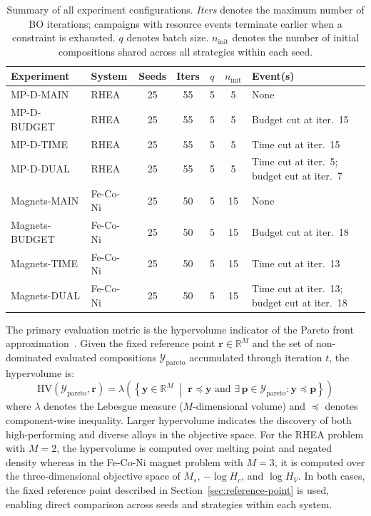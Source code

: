 \begin{table}[h]
\centering
\begin{tabular}{llccccp{4.5cm}}
\toprule
Experiment         & System                     & Seeds & Iters & $q$ & $n_\mathrm{init}$ & Event(s) \\
\midrule
MP-D-MAIN     & RHEA & 25   & 55    & 5   & 5 & None \\
MP-D-BUDGET   & RHEA & 25   & 55    & 5   & 5 & Budget cut at iter.\ 15 \\
MP-D-TIME     & RHEA & 25   & 55    & 5   & 5 & Time cut at iter.\ 15 \\
MP-D-DUAL     & RHEA & 25   & 55    & 5   & 5 & Time cut at iter.\ 5; budget cut at iter.\ 7 \\
Magnets-MAIN   & Fe-Co-Ni & 25  & 50    & 5   & 15 & None \\
Magnets-BUDGET & Fe-Co-Ni & 25  & 50    & 5   & 15 & Budget cut at iter.\ 18 \\
Magnets-TIME   & Fe-Co-Ni & 25  & 50    & 5   & 15 & Time cut at iter.\ 13 \\
Magnets-DUAL   & Fe-Co-Ni & 25  & 50    & 5   & 15 & Time cut at iter.\ 13; budget cut at iter.\ 18 \\
\bottomrule
\end{tabular}
\caption{Summary of all experiment configurations. \textit{Iters} denotes the maximum number of BO iterations; campaigns with resource events terminate earlier when a constraint is exhausted. $q$ denotes batch size. $n_\mathrm{init}$ denotes the number of initial compositions shared across all strategies within each seed.
}
\label{tab:experiments}
\end{table}

The primary evaluation metric is the hypervolume indicator of the Pareto front approximation~\citep{Zitzler1998}. Given the fixed reference point $\mathbf{r} \in \mathbb{R}^M$ and the set of non-dominated evaluated compositions $\mathcal{Y}_\mathrm{pareto}$ accumulated through iteration $t$, the hypervolume is:
%
\begin{equation}
\label{eq:hypervolume}
\mathrm{HV}(\mathcal{Y}_\mathrm{pareto}, \mathbf{r})
    = \lambda\!\left(
        \left\{
            \mathbf{y} \in \mathbb{R}^M \;\middle|\;
            \mathbf{r} \preceq \mathbf{y}
            \text{ and }
            \exists\, \mathbf{p} \in \mathcal{Y}_\mathrm{pareto} : \mathbf{y} \preceq \mathbf{p}
        \right\}
    \right)
\end{equation}
%
where $\lambda$ denotes the Lebesgue measure ($M$-dimensional volume) and $\preceq$ denotes component-wise inequality. Larger hypervolume indicates the discovery of both high-performing and diverse alloys in the objective space. For the RHEA problem with $M=2$, the hypervolume is computed over melting point and negated density whereas in the Fe-Co-Ni magnet problem with $M=3$, it is computed over the three-dimensional objective space of $M_s$, $-\log H_c$, and $\log H_V$. In both cases, the fixed reference point described in Section~\ref{sec:reference-point} is used, enabling direct comparison across seeds and strategies within each system. 

